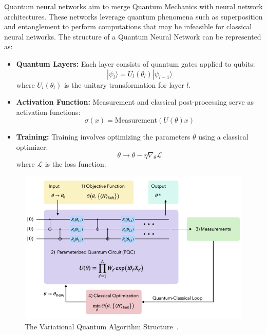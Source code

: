 \documentclass[12pt,a4paper]{report}
\begin{document}
Quantum neural networks aim to merge Quantum Mechanics with neural network architectures. These networks leverage quantum phenomena such as superposition and entanglement to perform computations that may be infeasible for classical neural networks. The structure of a Quantum Neural Network can be represented as:

\begin{itemize}
  \item \textbf{Quantum Layers:} Each layer consists of quantum gates applied to qubits:
        \begin{equation}
          | \psi_l \rangle = U_l(\theta_l) | \psi_{l-1} \rangle
        \end{equation}
        where \(U_l(\theta_l)\) is the unitary transformation for layer \(l\).

  \item \textbf{Activation Function:} Measurement and classical post-processing serve as activation functions:
        \begin{equation}
          \sigma(x) = \text{Measurement}(U(\theta)x)
        \end{equation}

  \item \textbf{Training:} Training involves optimizing the parameters \(\theta\) using a classical optimizer:
        \begin{equation}
          \theta \rightarrow \theta - \eta \nabla_\theta \mathcal{L}
        \end{equation}
        where \(\mathcal{L}\) is the loss function.
\end{itemize}

\begin{figure}[th]
  \centering
  \includegraphics[scale=0.81]{./pics/vqa.png}
  \caption[The Variational Quantum Algorithm Structure]{The Variational Quantum Algorithm Structure~\cite{wang2024comprehensive}.}
  \label{fig:p10}
\end{figure}
\end{document}
